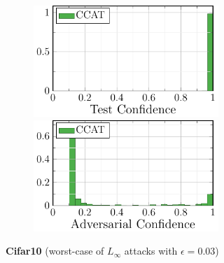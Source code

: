 \begin{figure}[t]
\begin{subfigure}[t]{0.485\textwidth}
\begin{subfigure}[t]{0.49\textwidth}
            \centering
            \includegraphics[width=1\textwidth]{fig_mnist_corr_ours10}
            
            \includegraphics[width=1\textwidth]{fig_mnist_succ_ours10}
        \end{subfigure}
    \end{subfigure}
    \hfill\vrule\hfill
    \begin{subfigure}[t]{0.485\textwidth}
        \vspace*{0px}
        
        \centering
        \textbf{Cifar10} (worst-case of $L_\infty$ attacks with $\epsilon = 0.03$)
        
        \begin{subfigure}[t]{0.49\textwidth}
            \vspace*{0px}
            

\end{subfigure}
\end{subfigure}
\end{figure}
